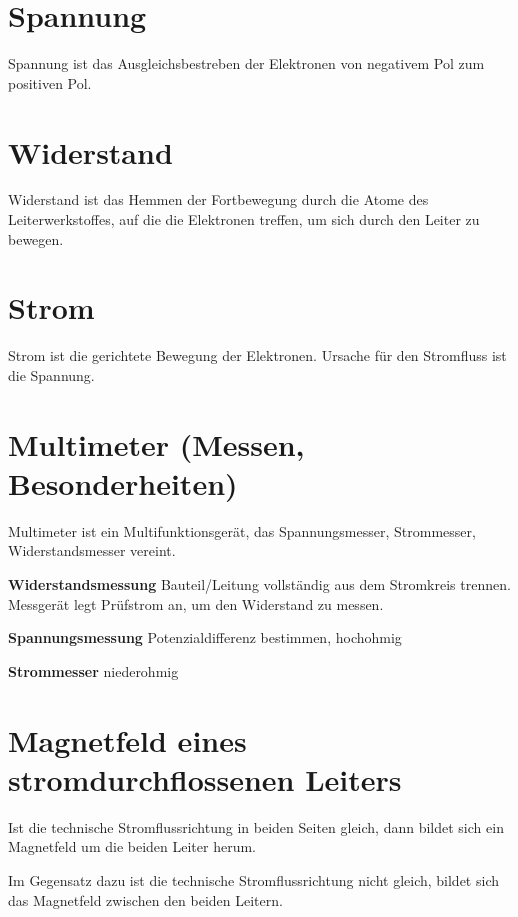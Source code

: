 \section{Spannung}\label{spannung}

Spannung ist das Ausgleichsbestreben der Elektronen von negativem Pol
zum positiven Pol.

\section{Widerstand}\label{widerstand}

Widerstand ist das Hemmen der Fortbewegung durch die Atome des
Leiterwerkstoffes, auf die die Elektronen treffen, um sich durch den
Leiter zu bewegen.

\section{Strom}\label{strom}

Strom ist die gerichtete Bewegung der Elektronen. Ursache für den
Stromfluss ist die Spannung.

\section{Multimeter (Messen,
Besonderheiten)}\label{multimeter-messen-besonderheiten}

Multimeter ist ein Multifunktionsgerät, das Spannungsmesser,
Strommesser, Widerstandsmesser vereint.

\textbf{Widerstandsmessung} Bauteil/Leitung vollständig aus dem
Stromkreis trennen. Messgerät legt Prüfstrom an, um den Widerstand zu
messen.

\textbf{Spannungsmessung} Potenzialdifferenz bestimmen, hochohmig

\textbf{Strommesser} niederohmig

\section{Magnetfeld eines stromdurchflossenen
Leiters}\label{magnetfeld-eines-stromdurchflossenen-leiters}

Ist die technische Stromflussrichtung in beiden Seiten gleich, dann
bildet sich ein Magnetfeld um die beiden Leiter herum.

Im Gegensatz dazu ist die technische Stromflussrichtung nicht gleich,
bildet sich das Magnetfeld zwischen den beiden Leitern.

